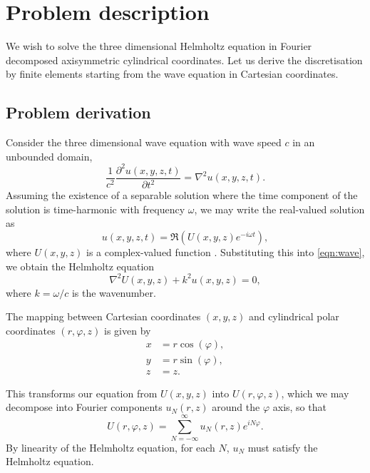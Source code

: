 \chapter{Problem description}

We wish to solve the three dimensional Helmholtz equation in Fourier decomposed axisymmetric cylindrical coordinates.
Let us derive the discretisation by finite elements starting from the wave equation in Cartesian coordinates.

\section{Problem derivation}

Consider the three dimensional wave equation with wave speed $c$ in an unbounded domain,
\begin{equation}
	\frac{1}{c^2} \frac{\partial^2 u(x,y,z,t)}{\partial t^2} = \nabla^2 u(x,y,z,t). \label{eqn:wave}
\end{equation}
Assuming the existence of a separable solution where the time component of the solution is time-harmonic with frequency $\omega$,
we may write the real-valued solution as
\[
	u(x,y,z,t) = \Re \left( U(x,y,z)e^{-i\omega t} \right),
\]
where $U(x,y,z)$ is a complex-valued function \cite{oomph_hh}.
Substituting this into \eqref{eqn:wave}, we obtain the Helmholtz equation
\begin{equation}
	\nabla^2 U(x,y,z) + k^2 u(x,y,z) = 0, \label{eqn:hh}
\end{equation}
where $k=\omega/c$ is the wavenumber.

The mapping between Cartesian coordinates $(x,y,z)$ and cylindrical polar coordinates $(r,\varphi,z)$ is given by
\begin{align}
	x &= r\cos(\varphi), \\
	y &= r\sin(\varphi), \\
	z &= z.
\end{align}

This transforms our equation from $U(x,y,z)$ into $U(r,\varphi,z)$, 
which we may decompose into Fourier components $u_N(r,z)$ around the $\varphi$ axis, so that
\begin{equation}
	U(r,\varphi,z) = \sum_{N=-\infty}^\infty u_N(r,z) e^{iN\varphi}.
\end{equation}
By linearity of the Helmholtz equation, for each $N$, $u_N$ must satisfy the Helmholtz equation.

